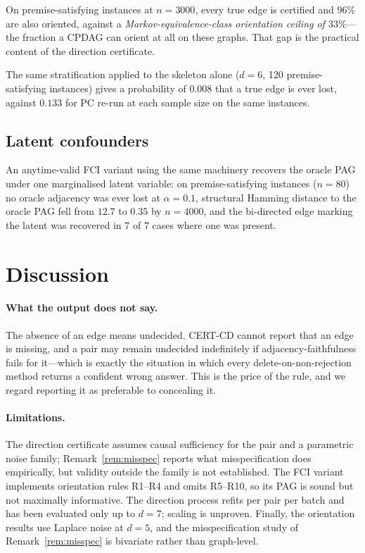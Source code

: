 \documentclass[11pt,a4paper]{article}
\theoremstyle{definition}
\theoremstyle{remark}
\begin{document}
On premise-satisfying instances at $n = 3000$, every true edge is certified and
$96\%$ are also oriented, against a \emph{Markov-equivalence-class orientation
ceiling of $33\%$}---the fraction a CPDAG can orient at all on these graphs.
That gap is the practical content of the direction certificate.

The same stratification applied to the skeleton alone ($d = 6$, 120
premise-satisfying instances) gives a probability of $0.008$ that a true edge is
ever lost, against $0.133$ for PC re-run at each sample size on the same
instances.

\subsection{Latent confounders}

An anytime-valid FCI variant using the same machinery recovers the oracle PAG
under one marginalised latent variable: on premise-satisfying instances
($n=80$) no oracle adjacency was ever lost at $\alpha = 0.1$, structural
Hamming distance to the oracle PAG fell from $12.7$ to $0.35$ by $n = 4000$, and
the bi-directed edge marking the latent was recovered in $7$ of $7$ cases where
one was present.

\section{Discussion}
\label{sec:discussion}

\paragraph{What the output does not say.} The absence of an edge means
undecided. CERT-CD cannot report that an edge is missing, and a pair may remain
undecided indefinitely if adjacency-faithfulness fails for it---which is exactly
the situation in which every delete-on-non-rejection method returns a confident
wrong answer. This is the price of the rule, and we regard reporting it as
preferable to concealing it.

\paragraph{Limitations.} The direction certificate assumes causal sufficiency
for the pair and a parametric noise family; Remark~\ref{rem:misspec} reports
what misspecification does empirically, but validity outside the family is not
established. The FCI variant implements orientation rules R1--R4 and omits
R5--R10, so its PAG is sound but not maximally informative. The direction
process refits per pair per batch and has been evaluated only up to $d = 7$;
scaling is unproven. Finally, the orientation results use Laplace noise at
$d = 5$, and the misspecification study of Remark~\ref{rem:misspec} is bivariate
rather than graph-level.
\end{document}
